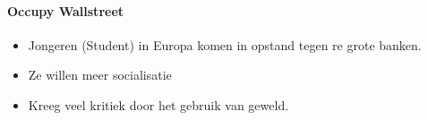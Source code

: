 \documentclass{article}
\begin{document}
\paragraph{Occupy Wallstreet}
\begin{itemize}
    \item Jongeren (Student) in Europa komen in opstand tegen re grote banken.
    \item Ze willen meer socialisatie
    \item Kreeg veel kritiek door het gebruik van geweld.
\end{itemize}
\end{document}
